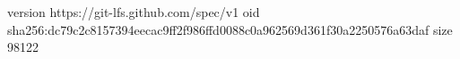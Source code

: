 version https://git-lfs.github.com/spec/v1
oid sha256:dc79c2c8157394eecac9ff2f986ffd0088c0a962569d361f30a2250576a63daf
size 98122
